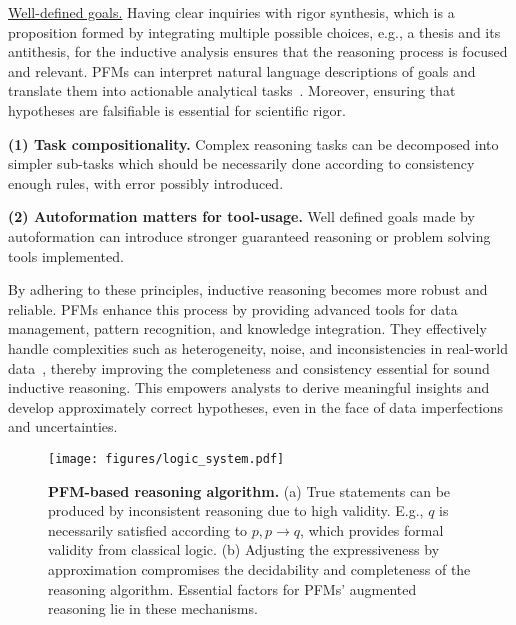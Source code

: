 \underline{Well-defined goals.} Having clear inquiries with rigor synthesis, which is a proposition formed by integrating multiple possible choices, e.g., a thesis and its antithesis, for the inductive analysis ensures that the reasoning process is focused and relevant. PFMs can interpret natural language descriptions of goals and translate them into actionable analytical tasks~\cite{li2023resdsql, gu2023few}. Moreover, ensuring that hypotheses are falsifiable is essential for scientific rigor.


\begin{takeawaybox}
    \textbf{(1) Task compositionality. } Complex reasoning tasks can be decomposed into simpler sub-tasks which should be necessarily done according to consistency enough rules, with error possibly introduced.
    
    \textbf{(2) Autoformation matters for tool-usage.} Well defined goals made by autoformation can introduce stronger guaranteed reasoning or problem solving tools implemented.
\end{takeawaybox}

  
By adhering to these principles, inductive reasoning becomes more robust and reliable. PFMs enhance this process by providing advanced tools for data management, pattern recognition, and knowledge integration. They effectively handle complexities such as heterogeneity, noise, and inconsistencies in real-world data~\cite{vos2022towards, deem}, thereby improving the completeness and consistency essential for sound inductive reasoning. This empowers analysts to derive meaningful insights and develop approximately correct hypotheses, even in the face of data imperfections and uncertainties.

  
  
  \begin{figure*}[h]
    \centering
    \texttt{[image: figures/logic\_system.pdf]} %
    \caption{\textbf{PFM-based reasoning algorithm.} (a) True statements can be produced by inconsistent reasoning due to high validity. E.g., $q$ is necessarily satisfied according to $p, p\rightarrow q$, which provides formal validity from classical logic. (b) Adjusting the expressiveness by approximation compromises the decidability and completeness of the reasoning algorithm. Essential factors for PFMs' augmented reasoning lie in these mechanisms.}
    \label{fig:logic_system}
  \end{figure*}
  
